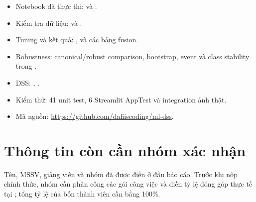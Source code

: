 \begin{itemize}[leftmargin=*]
  \item Notebook đã thực thi:
         và .
  \item Kiểm tra dữ liệu:
         và
        .
  \item Tuning và kết quả:
        ,
         và các bảng fusion.
  \item Robustness:
        canonical/robust comparison, bootstrap, event và class stability trong
        .
  \item DSS:
        ,
        .
  \item Kiểm thử: 41 unit test, 6 Streamlit AppTest và integration ảnh thật.
  \item Mã nguồn:
        \url{https://github.com/dafiiscoding/ml-dss}.
\end{itemize}

\section{Thông tin còn cần nhóm xác nhận}

Tên, MSSV, giảng viên và nhóm đã được điền ở đầu báo cáo. Trước khi nộp chính
thức, nhóm cần phân công các gói công việc và điền tỷ lệ đóng góp thực tế tại
; tổng tỷ lệ của bốn thành viên cần bằng 100\%.
